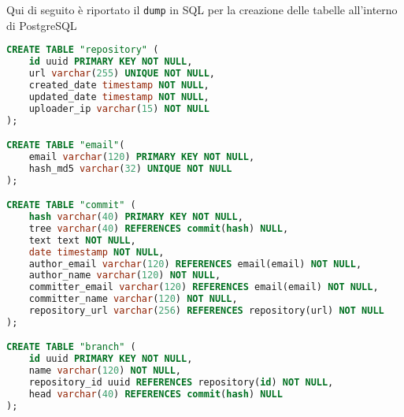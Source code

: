 Qui di seguito è riportato il \verb|dump| in SQL per la creazione delle tabelle all'interno di PostgreSQL
\begin{lstlisting}[language=SQL]
CREATE TABLE "repository" (
    id uuid PRIMARY KEY NOT NULL,
    url varchar(255) UNIQUE NOT NULL,
    created_date timestamp NOT NULL,
    updated_date timestamp NOT NULL,
	uploader_ip varchar(15) NOT NULL
);

CREATE TABLE "email"(
    email varchar(120) PRIMARY KEY NOT NULL,
    hash_md5 varchar(32) UNIQUE NOT NULL
);

CREATE TABLE "commit" (
    hash varchar(40) PRIMARY KEY NOT NULL,
    tree varchar(40) REFERENCES commit(hash) NULL,
    text text NOT NULL,
    date timestamp NOT NULL,
    author_email varchar(120) REFERENCES email(email) NOT NULL,
    author_name varchar(120) NOT NULL,
    committer_email varchar(120) REFERENCES email(email) NOT NULL,
    committer_name varchar(120) NOT NULL,
    repository_url varchar(256) REFERENCES repository(url) NOT NULL 
);

CREATE TABLE "branch" (
    id uuid PRIMARY KEY NOT NULL,
    name varchar(120) NOT NULL,
    repository_id uuid REFERENCES repository(id) NOT NULL,
    head varchar(40) REFERENCES commit(hash) NULL
);
\end{lstlisting}